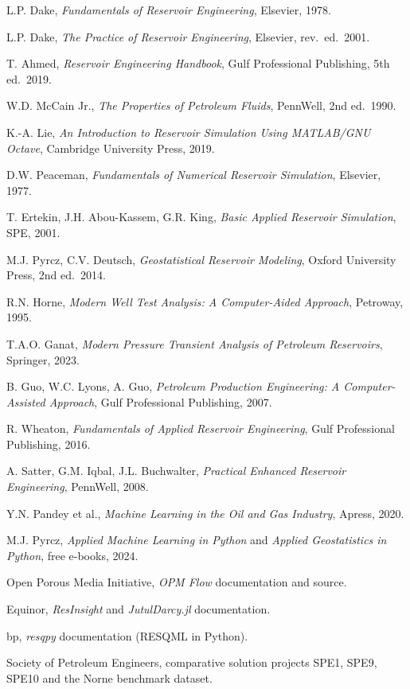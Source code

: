 \documentclass[11pt,a4paper]{article}
\begin{document}
\begin{enumerate}[leftmargin=1.6em, label={[\arabic*]}]
  \item L.P. Dake, \emph{Fundamentals of Reservoir Engineering}, Elsevier, 1978.
  \item L.P. Dake, \emph{The Practice of Reservoir Engineering}, Elsevier, rev.\ ed.\ 2001.
  \item T. Ahmed, \emph{Reservoir Engineering Handbook}, Gulf Professional Publishing, 5th ed.\ 2019.
  \item W.D. McCain Jr., \emph{The Properties of Petroleum Fluids}, PennWell, 2nd ed.\ 1990.
  \item K.-A. Lie, \emph{An Introduction to Reservoir Simulation Using MATLAB/GNU Octave}, Cambridge University Press, 2019.
  \item D.W. Peaceman, \emph{Fundamentals of Numerical Reservoir Simulation}, Elsevier, 1977.
  \item T. Ertekin, J.H. Abou-Kassem, G.R. King, \emph{Basic Applied Reservoir Simulation}, SPE, 2001.
  \item M.J. Pyrcz, C.V. Deutsch, \emph{Geostatistical Reservoir Modeling}, Oxford University Press, 2nd ed.\ 2014.
  \item R.N. Horne, \emph{Modern Well Test Analysis: A Computer-Aided Approach}, Petroway, 1995.
  \item T.A.O. Ganat, \emph{Modern Pressure Transient Analysis of Petroleum Reservoirs}, Springer, 2023.
  \item B. Guo, W.C. Lyons, A. Guo, \emph{Petroleum Production Engineering: A Computer-Assisted Approach}, Gulf Professional Publishing, 2007.
  \item R. Wheaton, \emph{Fundamentals of Applied Reservoir Engineering}, Gulf Professional Publishing, 2016.
  \item A. Satter, G.M. Iqbal, J.L. Buchwalter, \emph{Practical Enhanced Reservoir Engineering}, PennWell, 2008.
  \item Y.N. Pandey et al., \emph{Machine Learning in the Oil and Gas Industry}, Apress, 2020.
  \item M.J. Pyrcz, \emph{Applied Machine Learning in Python} and \emph{Applied Geostatistics in Python}, free e-books, 2024.
  \item Open Porous Media Initiative, \emph{OPM Flow} documentation and source.
  \item Equinor, \emph{ResInsight} and \emph{JutulDarcy.jl} documentation.
  \item bp, \emph{resqpy} documentation (RESQML in Python).
  \item Society of Petroleum Engineers, comparative solution projects SPE1, SPE9, SPE10 and the Norne benchmark dataset.
\end{enumerate}
\end{document}
